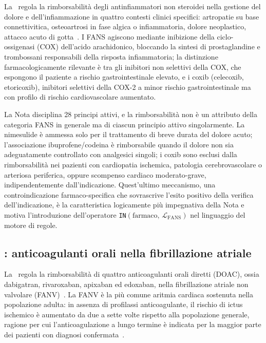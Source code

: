 La \notesessanta\ regola la rimborsabilità degli antinfiammatori non steroidei
nella gestione del dolore e dell'infiammazione in quattro contesti
clinici specifici: artropatie su base connettivitica, osteoartrosi in fase
algica o infiammatoria, dolore neoplastico, attacco acuto di gotta~\cite{nota66aifa}.
I FANS agiscono mediante inibizione della ciclo-ossigenasi (COX) dell'acido
arachidonico, bloccando la sintesi di prostaglandine e trombossani responsabili
della risposta infiammatoria; la distinzione farmacologicamente rilevante è
tra gli inibitori non selettivi della COX, che espongono il paziente a rischio
gastrointestinale elevato, e i coxib (celecoxib, etoricoxib), inibitori
selettivi della COX-2 a minor rischio gastrointestinale ma con profilo di
rischio cardiovascolare aumentato.

La Nota disciplina 28 principi attivi, e la rimborsabilità non è un attributo
della categoria FANS in generale ma di ciascun principio attivo singolarmente.
La nimesulide è ammessa solo per il trattamento di breve durata del dolore
acuto; l'associazione ibuprofene/codeina è rimborsabile quando il dolore non
sia adeguatamente controllato con analgesici singoli; i coxib sono esclusi
dalla rimborsabilità nei pazienti con cardiopatia ischemica, patologia
cerebrovascolare o arteriosa periferica, oppure scompenso cardiaco
moderato-grave, indipendentemente dall'indicazione.
Quest'ultimo meccanismo, una controindicazione farmaco-specifica che sovrascrive
l'esito positivo della verifica dell'indicazione, è la caratteristica logicamente
più impegnativa della Nota e motiva l'introduzione dell'operatore
\texttt{IN}$(\text{farmaco},\,\mathcal{L}_\text{FANS})$ nel linguaggio
del motore di regole.

\subsection{\notenova: anticoagulanti orali nella fibrillazione atriale}
\label{subsec:nota97}

La \notenova\ regola la rimborsabilità di quattro anticoagulanti orali diretti
(DOAC), ossia dabigatran, rivaroxaban, apixaban ed edoxaban, nella fibrillazione
atriale non valvolare (FANV)~\cite{aifa2018nota97}.
La FANV è la più comune aritmia cardiaca sostenuta nella popolazione adulta: in
assenza di profilassi anticoagulante, il rischio di ictus ischemico è aumentato
da due a sette volte rispetto alla popolazione generale, ragione per cui
l'anticoagulazione a lungo termine è indicata per la maggior parte dei pazienti
con diagnosi confermata~\cite{esc2020afib}.

